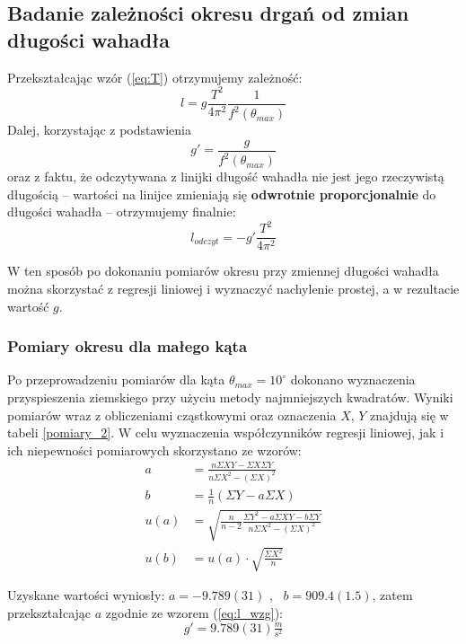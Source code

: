 \documentclass[a4paper]{article}
\newlength{\du}
\begin{document}


\subsection{Badanie zależności okresu drgań od zmian długości wahadła}

Przekształcając wzór (\ref{eq:T})  otrzymujemy zależność:
\[l = g\frac{T^2}{4\pi^2}\frac{1}{f^2(\theta_{max})} \]
Dalej, korzystając z podstawienia \[g' = \frac{g}{f^2(\theta_{max})} \]
oraz z faktu, że odczytywana z linijki długość wahadła nie jest jego rzeczywistą długością --
wartości na linijce zmieniają się \textbf{odwrotnie proporcjonalnie} do długości wahadła --
otrzymujemy finalnie:
\begin{equation} \label{eq:l_wzg}
 l_{odczyt} = -g'\frac{T^2}{4\pi^2}
\end{equation}

W ten sposób po dokonaniu pomiarów okresu przy zmiennej długości wahadła można skorzystać z regresji liniowej i wyznaczyć nachylenie prostej, a w rezultacie wartość $g$.

\subsubsection{Pomiary okresu dla małego kąta}

Po przeprowadzeniu pomiarów dla kąta $\theta_{max} = 10^\circ$ dokonano wyznaczenia 
przyspieszenia ziemskiego przy użyciu metody najmniejszych kwadratów. 
Wyniki pomiarów wraz z obliczeniami cząstkowymi oraz oznaczenia $X$, $Y$ znajdują się w tabeli \ref{pomiary_2}.
W celu wyznaczenia współczynników regresji liniowej, jak i ich niepewności pomiarowych skorzystano ze wzorów:
\begin{align*}
a &= \frac{n \Sigma X Y - \Sigma X \Sigma Y}{n \Sigma X^2 - \left(\Sigma X\right)^2} \\
b &= \frac{1}{n}\left(\Sigma Y - a \Sigma X\right) \\
u(a) &= \sqrt{\frac{n}{n-2} \frac{\Sigma Y^2 - a\Sigma XY - b\Sigma Y}{n\Sigma X^2-\left(\Sigma X \right)^2}} \\
u(b) &= u(a)\cdot \sqrt{\frac{\Sigma X^2}{n}}
\end{align*}

Uzyskane wartości wyniosły: $a = -9.789(31)$  , \ $b = 909.4(1.5)$,
zatem przekształcając $a$ zgodnie ze wzorem (\ref{eq:l_wzg}):  \[g' = 9.789(31)  \tfrac{m}{s^2}\]
\end{document}
